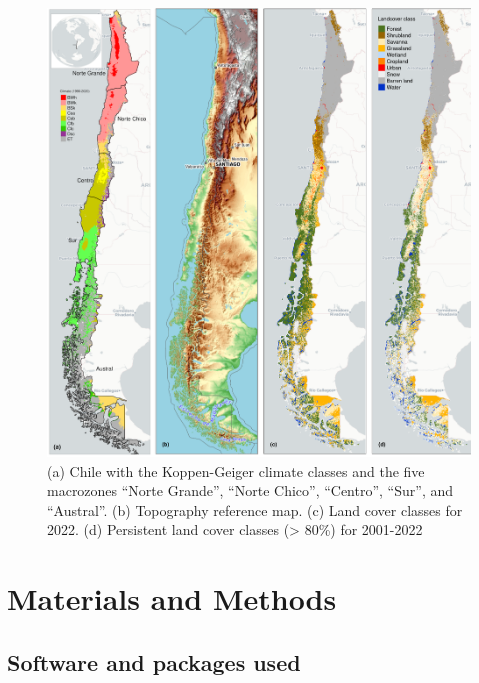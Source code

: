 \documentclass[
  authoryear,
  preprint,
  3p,
  onecolumn]{elsarticle}
\begin{document}
\begin{figure}[!ht]

{\centering \includegraphics{../output/figs/map_study_con_landcover.png}

}

\caption{\label{fig-studyArea}(a) Chile with the Koppen-Geiger climate
classes and the five macrozones ``Norte Grande'', ``Norte Chico'',
``Centro'', ``Sur'', and ``Austral''. (b) Topography reference map. (c)
Land cover classes for 2022. (d) Persistent land cover classes
(\textgreater{} 80\%) for 2001-2022}

\end{figure}

\hypertarget{materials-and-methods}{%
\section{Materials and Methods}\label{materials-and-methods}}

\hypertarget{software-and-packages-used}{%
\subsection{Software and packages
used}\label{software-and-packages-used}}
\end{document}
